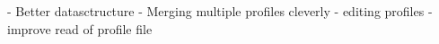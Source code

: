 - Better datasctructure
- Merging multiple profiles cleverly
- editing profiles
- improve read of profile file
